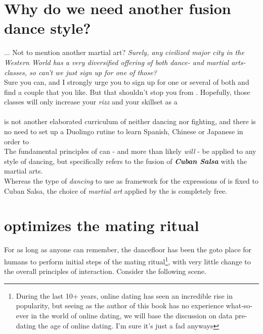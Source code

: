 \section*{Why do we need another fusion dance style?}
... Not to mention another martial art? \textit{Surely, any civilized major city in the Western World has a very diversified offering of both dance- and martial arts-classes, so can't we just sign up for one of those?}\\
Sure you can, and I strongly urge you to sign up for one or several of both and find a couple that you like. But that shouldn't stop you from \sovsing. Hopefully, those classes will only increase your \textit{rizz} and your skillset as a \sovseneer

\paragraph{}
\sovs is not another elaborated curriculum of neither dancing nor fighting, and there is no need to set up a Duolingo rutine to learn Spanish, Chinese or Japanese in order to \sovs\\
The fundamental principles of \sovs can - and more than likely \textit{will} - be applied to any style of dancing, but \sovs specifically refers to the fusion of \textbf{\textit{Cuban Salsa}} with the martial arts.\\
Whereas the type of \textit{dancing} to use as framework for the expressions of \sovs is fixed to Cuban Salsa, the choice of \textit{martial art} applied by the \sovseneer is completely free.

\section*{\sovs optimizes the mating ritual}
For as long as anyone can remember, the dancefloor has been the goto place for humans to perform initial steps of the mating ritual\footnote{During the last 10+ years, online dating has seen an incredible rise in popularity, but seeing as the author of this book has no experience what-so-ever in the world of online dating, we will base the discussion on data pre-dating the age of online dating. I'm sure it's just a fad anyways}, with very little change to the overall principles of interaction. Consider the following scene.

